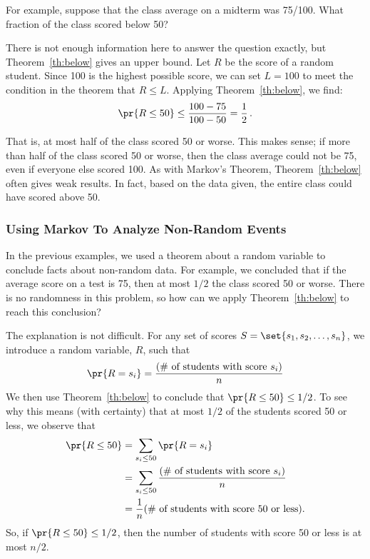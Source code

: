 \begin{editingnotes}
For example, suppose that the class average on a midterm was
75/100.  What fraction of the class scored below 50?

There is not enough information here to answer the question exactly,
but Theorem~\ref{th:below} gives an upper bound.  Let $R$ be the score
of a random student.  Since 100 is the highest possible score, we
can set $L = 100$ to meet the condition in the theorem that $R \leq
L$.  Applying Theorem~\ref{th:below}, we find:
\begin{displaymath}
  \pr{R \leq 50} \leq \frac{100 - 75}{100 - 50} = \frac{1}{2}\,.
\end{displaymath}

That is, at most half of the class scored 50 or worse.  This makes
sense; if more than half of the class scored 50 or worse, then the
class average could not be 75, even if everyone else scored 100.
As with Markov's Theorem, Theorem~\ref{th:below} often gives weak
results.  In fact, based on the data given, the entire class could
have scored above 50.

\end{editingnotes}

\begin{editingnotes}
\subsubsection{Using Markov To Analyze Non-Random Events}

In the previous examples, we used a theorem about a random variable to
conclude facts about non-random data.  For example, we concluded that
if the average score on a test is 75, then at most $1/2$ the
class scored 50 or worse.  There is no randomness in this problem,
so how can we apply Theorem~\ref{th:below} to reach this conclusion?

The explanation is not difficult.  For any set of scores $S = \set{s_1,
s_2, \dots, s_n}$, we introduce a random variable, $R$, such that
\[
\pr{R = s_i} = \frac{\text{(\# of students with score $s_i$)}}{n}
\]
We then use Theorem~\ref{th:below} to conclude that $\pr{R \leq 50}
\leq 1/2$.  To see why this means (with certainty) that at most
$1/2$ of the students scored 50 or less, we observe that
\begin{align*}
\pr{R \leq 50}
    & = \sum_{s_i \leq 50} \pr{R = s_i} \\
    & = \sum_{s_i \leq 50} \frac{\text{(\# of students with score $s_i$)}}{n} \\
    & = \frac{1}{n} \text{(\# of students with score 50 or less)}.
\end{align*}
So, if $\pr{R \leq 50} \leq 1/2$, then the number of students
with score 50 or less is at most $n/2$.

\end{editingnotes}

